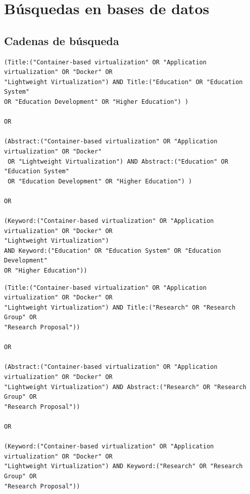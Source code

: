 \appendix


\chapter{Búsquedas en bases de datos}

\section{Cadenas de búsqueda}\label{sec:cadenas-busqueda}


\begin{tcolorbox}[
		colback=gray!5,
		colframe=black!60,
		title=Cadena de búsqueda en ACM para educación,
		fonttitle=\bfseries,
		sharp corners=south
	]
	\scriptsize %
	\begin{verbatim}
(Title:("Container-based virtualization" OR "Application virtualization" OR "Docker" OR 
"Lightweight Virtualization") AND Title:("Education" OR "Education System" 
OR "Education Development" OR "Higher Education") ) 

OR

(Abstract:("Container-based virtualization" OR "Application virtualization" OR "Docker"
 OR "Lightweight Virtualization") AND Abstract:("Education" OR "Education System" 
 OR "Education Development" OR "Higher Education") )

OR

(Keyword:("Container-based virtualization" OR "Application virtualization" OR "Docker" OR 
"Lightweight Virtualization")
AND Keyword:("Education" OR "Education System" OR "Education Development" 
OR "Higher Education"))
\end{verbatim}
\end{tcolorbox}

\begin{tcolorbox}[
		colback=gray!5,
		colframe=black!60,
		title=Cadena de búsqueda en ACM para investigación,
		fonttitle=\bfseries,
		sharp corners=south
	]
	\scriptsize %
	\begin{verbatim}
(Title:("Container-based virtualization" OR "Application virtualization" OR "Docker" OR 
"Lightweight Virtualization") AND Title:("Research" OR "Research Group" OR 
"Research Proposal"))

OR

(Abstract:("Container-based virtualization" OR "Application virtualization" OR "Docker" OR 
"Lightweight Virtualization") AND Abstract:("Research" OR "Research Group" OR 
"Research Proposal"))

OR

(Keyword:("Container-based virtualization" OR "Application virtualization" OR "Docker" OR 
"Lightweight Virtualization") AND Keyword:("Research" OR "Research Group" OR 
"Research Proposal"))
\end{verbatim}
\end{tcolorbox}

